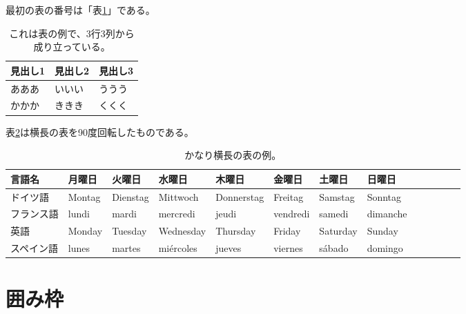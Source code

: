 \documentclass[ %
	uplatex,%
	a5paper,%
	papersize%
	]{jsbook}
\begin{document}
						最初の表の番号は「表\ref{tb:table-example}」である。

						\begin{table}[h]
							\caption{これは表の例で、3行3列から成り立っている。}
							\label{tb:table-example}
							\begin{center}
								\begin{tabular}{lll} \toprule
									見出し1 & 見出し2 & 見出し3 \\ \midrule
									あああ & いいい & ううう \\
									かかか & ききき & くくく \\ \bottomrule
								\end{tabular}
							\end{center}
						\end{table}

						表\ref{tb:wide-table-example}は横長の表を90度回転したものである。

						\begin{landscape}
							\begin{table}
								\caption{かなり横長の表の例。}
								\label{tb:wide-table-example}
								\begin{center}
									\begin{tabular}{lllllllllllll} \toprule
										言語名   & 月曜日     & 火曜日      & 水曜日       & 木曜日        & 金曜日       & 土曜日      & 日曜日      \\ \midrule
										ドイツ語  & Montag  & Dienstag & Mittwoch  & Donnerstag & Freitag   & Samstag  & Sonntag  \\
										フランス語 & lundi   & mardi    & mercredi  & jeudi      & vendredi  & samedi   & dimanche \\
										英語    & Monday  & Tuesday  & Wednesday & Thursday   & Friday    & Saturday & Sunday   \\
										スペイン語 & lunes   & martes   & miércoles & jueves     & viernes   & sábado   & domingo  \\ \bottomrule
									\end{tabular}
								\end{center}
							\end{table}
						\end{landscape}

						\section{囲み枠}
\end{document}
